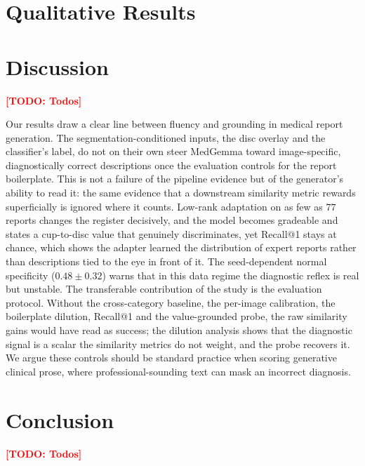 \documentclass[runningheads]{llncs}
\newcommand{\todo}[1]{\textcolor{red}{\textbf{[TODO: #1]}}}
\begin{document}
\section{Qualitative Results}

\section{Discussion}
\todo{Todos}


Our results draw a clear line between fluency and grounding in medical report generation.
The segmentation-conditioned inputs, the disc overlay and the classifier's label, do not on
their own steer MedGemma toward image-specific, diagnostically correct descriptions once
the evaluation controls for the report boilerplate. This is not a failure of the pipeline
evidence but of the generator's ability to read it: the same evidence that a downstream
similarity metric rewards superficially is ignored where it counts. Low-rank adaptation on
as few as $77$ reports changes the register decisively, and the model becomes gradeable and
states a cup-to-disc value that genuinely discriminates, yet Recall@1 stays at chance,
which shows the adapter learned the distribution of expert reports rather than descriptions
tied to the eye in front of it. The seed-dependent normal specificity ($0.48\pm0.32$) warns
that in this data regime the diagnostic reflex is real but unstable. The transferable
contribution of the study is the evaluation protocol. Without the cross-category baseline,
the per-image calibration, the boilerplate dilution, Recall@1 and the value-grounded probe,
the raw similarity gains would have read as success; the dilution analysis shows that the
diagnostic signal is a scalar the similarity metrics do not weight, and the probe recovers
it. We argue these controls should be standard practice when scoring generative clinical
prose, where professional-sounding text can mask an incorrect diagnosis.
\section{Conclusion}
\todo{Todos}
\end{document}
